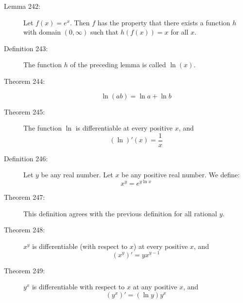 \documentclass{article}
\begin{document}
\begin{description}

  \item[Lemma 242:] Let $f(x) = e^{x}$. Then $f$ has the property that there exists a function $h$ with domain $(0, \infty)$ such that $h(f(x)) = x$ for all $x$.

  \item[Definition 243:] The function $h$ of the preceding lemma is called $\ln(x)$.

  \item[Theorem 244:]
    \begin{equation*}
    \ln (ab) = \ln a + \ln b
    \end{equation*}

  \item[Theorem 245:] The function $\ln$ is differentiable at every positive $x$, and
    \begin{equation*}
    (\ln)' (x) = \frac{1}{x}
    \end{equation*}

  \item[Definition 246:] Let $y$ be any real number. Let $x$ be any positive real number. We define:
    \begin{equation*}
    x^{y} = e^{y \ln x}
    \end{equation*}

  \item[Theorem 247:] This definition agrees with the previous definition for all rational $y$.

  \item[Theorem 248:] $x^{y}$ is differentiable (with respect to $x$) at every positive $x$, and
    \begin{equation*}
    (x^{y})' = yx^{y-1}
    \end{equation*}

  \item[Theorem 249:] $y^{x}$ is differentiable with respect to $x$ at any positive $x$, and
    \begin{equation*}
    (y^{x})' = (\ln y) y^{x}
    \end{equation*}

\end{description}
\end{document}

